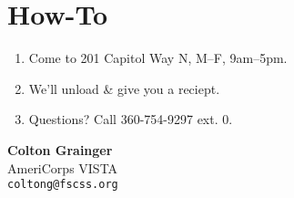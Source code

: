 \documentclass[14pt]{extarticle}
\begin{document}
\section*{How-To}

\begin{enumerate}[itemsep=0pt]
	\item Come to 201 Capitol Way N, M--F, 9am--5pm.
    \item We'll unload \& give you a reciept.
    \item Questions? Call 360-754-9297 ext. 0.
\end{enumerate}

\vspace{-65pt}
\small
\begin{flushright}
\textbf{Colton Grainger}\\
AmeriCorps VISTA\\
\texttt{coltong@fscss.org}\\
\end{flushright}
\end{document}

